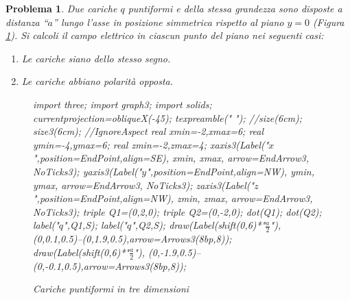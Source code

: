\documentclass[b5paper,twoside]{book}
\newtheorem{problema}{Problema}
\let\oldhat\hat
\renewcommand{\vec}[1]{\mathbf{#1}}
\renewcommand{\hat}[1]{\widehat{\mathbf{#1}}}
\begin{document}
\begin{problema}
	Due cariche $q$ puntiformi e della stessa grandezza
	sono disposte a distanza ``$a$'' lungo l'asse in
	posizione simmetrica rispetto al piano $y = 0$
	(Figura \ref{fig:dipolo_3d}).
	Si calcoli il campo elettrico in ciascun punto del
	piano nei seguenti casi:
	\begin{enumerate}%
		\item Le cariche siano dello stesso segno.
		\item Le cariche abbiano polarità opposta.
	\end{enumerate}
	\begin{figure}[H]
			\centering
			\begin{asy}[height=6cm,inline=true,attach=false,viewportwidth=\linewidth]
				import three;
				import graph3;
				import solids;
				currentprojection=obliqueX(-45);
				texpreamble("\let\oldhat\hat
				\renewcommand{\vec}[1]{\mathbf{#1}}
				\renewcommand{\hat}[1]{\oldhat{\mathbf{#1}}}");
				//size(6cm);
				size3(6cm);		//IgnoreAspect
				real xmin=-2,xmax=6;
				real ymin=-4,ymax=6;
				real zmin=-2,zmax=4;
				xaxis3(Label("\small $x$",position=EndPoint,align=SE),
				xmin, xmax, arrow=EndArrow3, NoTicks3);
				yaxis3(Label("\small $y$",position=EndPoint,align=NW),
				ymin, ymax, arrow=EndArrow3, NoTicks3);
				zaxis3(Label("\small $z$",position=EndPoint,align=NW),
				zmin, zmax, arrow=EndArrow3, NoTicks3);
				triple Q1=(0,2,0);
				triple Q2=(0,-2,0);			
				dot(Q1);
				dot(Q2);
				label("\small $q$",Q1,S);
				label("\small $q$",Q2,S);
				draw(Label(shift(0,6)*"\small $\frac{a}{2}$"),
				(0,0.1,0.5)--(0,1.9,0.5),arrow=Arrows3(8bp,8));
				draw(Label(shift(0,6)*"\small $\frac{a}{2}$"),
				(0,-1.9,0.5)--(0,-0.1,0.5),arrow=Arrows3(8bp,8));
			\end{asy}
			\caption{Cariche puntiformi in tre dimensioni}
			\label{fig:dipolo_3d}
		\end{figure}
\end{problema}
\end{document}
